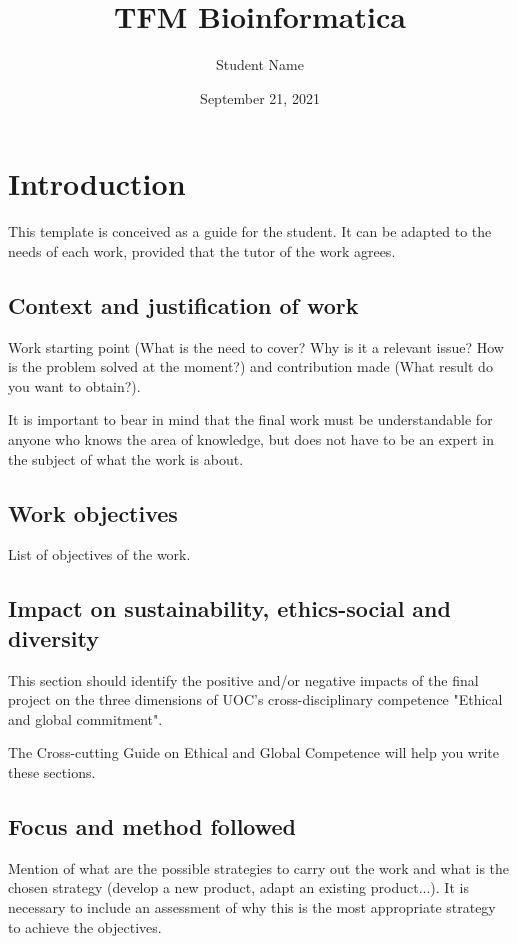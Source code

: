 \documentclass[ENG,BIB]{TFUOC}%
\title{TFM Bioinformatica}
\author{Student Name}
\date{September 21, 2021}
\begin{document}
\estructura

\tableofcontents

\listoffigures

\listoftables




\chapter{Introduction}

This template is conceived as a guide for the student. It can be adapted to the needs of each work, provided that the tutor of the work agrees.

\section{Context and justification of work}


Work starting point (What is the need to cover? Why is it a relevant issue? How is the problem solved at the moment?) and contribution made (What result do you want to obtain?).

It is important to bear in mind that the final work must be understandable for anyone who knows the area of knowledge, but does not have to be an expert in the subject of what the work is about.

\section{Work objectives}

List of objectives of the work.

\section{Impact on sustainability, ethics-social and diversity}
\label{s:etic}

This section should identify the positive and/or negative impacts of the final project on the three dimensions of UOC's cross-disciplinary competence "Ethical and global commitment".
 
The Cross-cutting Guide on Ethical and Global Competence will help you write these sections.


\section{Focus and method followed}

Mention of what are the possible strategies to carry out the work and what is the chosen strategy (develop a new product, adapt an existing product...). It is necessary to include an assessment of why this is the most appropriate strategy to achieve the objectives.   	
\end{document}
